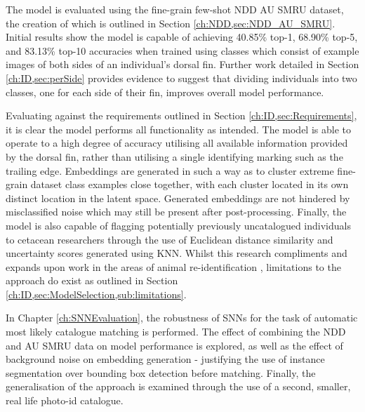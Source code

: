 The model is evaluated using the fine-grain few-shot NDD AU SMRU dataset, the creation of which is outlined in Section \ref{ch:NDD,sec:NDD_AU_SMRU}. Initial results show the model is capable of achieving 40.85\% top-1, 68.90\% top-5, and 83.13\% top-10 accuracies when trained using classes which consist of example images of both sides of an individual's dorsal fin. Further work detailed in Section \ref{ch:ID,sec:perSide} provides evidence to suggest that dividing individuals into two classes, one for each side of their fin, improves overall model performance. 

Evaluating against the requirements outlined in Section \ref{ch:ID,sec:Requirements}, it is clear the model performs all functionality as intended. The model is able to operate to a high degree of accuracy utilising all available information provided by the dorsal fin, rather than utilising a single identifying marking such as the trailing edge. Embeddings are generated in such a way as to cluster extreme fine-grain dataset class examples close together, with each cluster located in its own distinct location in the latent space. Generated embeddings are not hindered by misclassified noise which may still be present after post-processing. Finally, the model is also capable of flagging potentially previously uncatalogued individuals to cetacean researchers through the use of Euclidean distance similarity and uncertainty scores generated using KNN. Whilst this research compliments and expands upon work in the areas of animal re-identification \cite{vetrova_hidden_2018, clapham_automated_2020, birenbaum_sealnet_2022}, limitations to the approach do exist as outlined in Section \ref{ch:ID,sec:ModelSelection,sub:limitations}. 

In Chapter \ref{ch:SNNEvaluation}, the robustness of SNNs for the task of automatic most likely catalogue matching is performed. The effect of combining the NDD and AU SMRU data on model performance is explored, as well as the effect of background noise on embedding generation - justifying the use of instance segmentation over bounding box detection before matching. Finally, the generalisation of the approach is examined through the use of a second, smaller, real life photo-id catalogue. 

